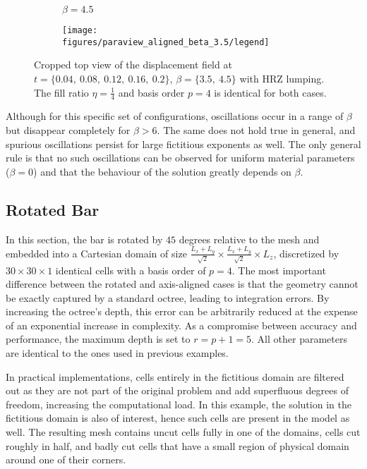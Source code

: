 \begin{figure}[!h]
\begin{subfigure}[b]{0.45\textwidth}
		\centering
		\caption{$\beta=4.5$}
	\end{subfigure}
	\begin{subfigure}[b]{0.95\textwidth}
		\centering
		\texttt{[image: figures/paraview\_aligned\_beta\_3.5/legend]}
	\end{subfigure}
	\caption{Cropped top view of the displacement field at $t=\{0.04, \ 0.08, \ 0.12, \ 0.16, \ 0.2\}$, $\beta = \{3.5, \ 4.5\}$ with HRZ lumping. The fill ratio $\eta=\frac{1}{4}$ and basis order $p=4$ is identical for both cases.}
	\label{fig:hrz_displacement_field_beta}
\end{figure}

Although for this specific set of configurations, oscillations occur in a range of $\beta$ but disappear completely for $\beta > 6$. The same does not hold true in general, and spurious oscillations persist for large fictitious exponents as well. The only general rule is that no such oscillations can be observed for uniform material parameters ($\beta=0$) and that the behaviour of the solution greatly depends on $\beta$.

%
\subsection{Rotated Bar}
\label{section:rotated_bar}
%

In this section, the bar is rotated by $45$ degrees relative to the mesh and embedded into a Cartesian domain of size $\frac{L_x + L_y}{\sqrt{2}} \times \frac{L_x + L_y}{\sqrt{2}} \times L_z$, discretized by $30 \times 30 \times 1$ identical cells with a basis order of $p=4$.
The most important difference between the rotated and axis-aligned cases is that the geometry cannot be exactly captured by a standard octree, leading to integration errors. By increasing the octree's depth, this error can be arbitrarily reduced at the expense of an exponential increase in complexity. As a compromise between accuracy and performance, the maximum depth is set to $r=p+1=5$.
All other parameters are identical to the ones used in previous examples.

In practical implementations, cells entirely in the fictitious domain are filtered out as they are not part of the original problem and add superfluous degrees of freedom, increasing the computational load. In this example, the solution in the fictitious domain is also of interest, hence such cells are present in the model as well. The resulting mesh contains uncut cells fully in one of the domains, cells cut roughly in half, and badly cut cells that have a small region of physical domain around one of their corners.

